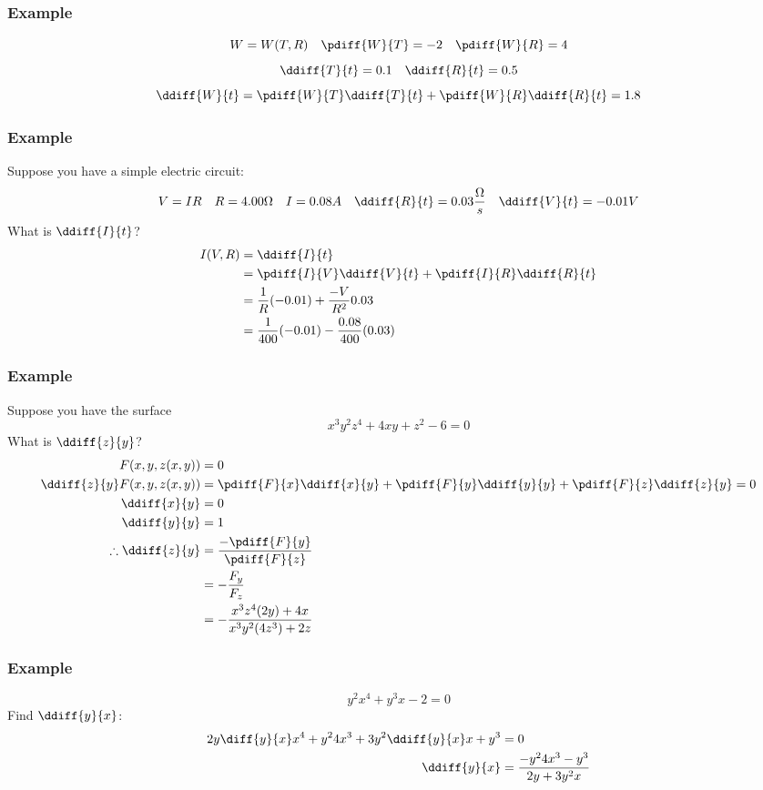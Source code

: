 \documentclass[letterpaper, 12pt]{math}
\begin{document}
\subsubsection*{Example}
\[ W = W(T,R) \quad \pdiff{W}{T} = -2 \quad \pdiff{W}{R} = 4 \]
\[ \ddiff{T}{t} = 0.1 \quad \ddiff{R}{t} = 0.5 \]
\[ \ddiff{W}{t} = \pdiff{W}{T}\ddiff{T}{t}+\pdiff{W}{R}\ddiff{R}{t} = 1.8 \]

\subsubsection*{Example}
Suppose you have a simple electric circuit:
\[ V = IR \quad R = 4.00\Omega \quad I = 0.08A \quad
  \ddiff{R}{t} = 0.03\frac{\Omega}{s} \quad \ddiff{V}{t} = -0.01V \]
What is \( \ddiff{I}{t} \)?
\begin{align*}
  I(V,R) &= \ddiff{I}{t} \\
  &= \pdiff{I}{V}\ddiff{V}{t}+\pdiff{I}{R}\ddiff{R}{t} \\
  &= \frac{1}{R}(-0.01)+\frac{-V}{R^2}{0.03} \\
  &= \frac{1}{400}(-0.01)-\frac{0.08}{400}(0.03)
\end{align*}

\subsubsection*{Example}
Suppose you have the surface
\[ x^3y^2z^4+4xy+z^2-6 = 0 \]
What is \( \ddiff{z}{y} \)?
\begin{align*}
  F(x,y,z(x,y)) &= 0 \\
  \ddiff{z}{y}F(x,y,z(x,y)) &=
    \pdiff{F}{x}\ddiff{x}{y}+\pdiff{F}{y}\ddiff{y}{y}+
    \pdiff{F}{z}\ddiff{z}{y} = 0 \\
  \ddiff{x}{y} &= 0 \\
  \ddiff{y}{y} &= 1\\
  \therefore \ddiff{z}{y} &= \frac{-\pdiff{F}{y}}{\pdiff{F}{z}} \\
  &= -\frac{F_y}{F_z} \\
  &= -\frac{x^3z^4(2y)+4x}{x^3y^2(4z^3)+2z}
\end{align*}

\subsubsection*{Example}
\[ y^2x^4+y^3x-2 = 0 \]
Find \( \ddiff{y}{x} \):
\begin{align*}
  2y\diff{y}{x}x^4+y^{2}4x^3+3y^2\ddiff{y}{x}x+y^3 &= 0 \\
  \ddiff{y}{x} &= \frac{-y^{2}4x^3-y^3}{2y+3y^{2}x}
\end{align*}
\end{document}
